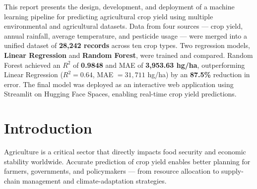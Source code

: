 \documentclass[12pt,a4paper]{article}
\begin{document}
\begin{titlepage}
\vfill


\vspace{1.2cm}
\restoregeometry
\end{titlepage}

\newpage\thispagestyle{empty}\tableofcontents\newpage
{}

\begin{mdframed}[
  linecolor=primary,linewidth=1.2pt,backgroundcolor=lightblue!30,
  innertopmargin=10pt,innerbottommargin=10pt,
  innerleftmargin=12pt,innerrightmargin=12pt,
  frametitle={\bfseries\color{white}\normalsize\; Abstract},
  frametitlebackgroundcolor=primary,frametitlerule=false,
  frametitleaboveskip=4pt,frametitlebelowskip=4pt]
\small
This report presents the design, development, and deployment of a machine learning
pipeline for predicting agricultural crop yield using multiple environmental and
agricultural datasets. Data from four sources --- crop yield, annual rainfall, average
temperature, and pesticide usage --- were merged into a unified dataset of
\textbf{28,242 records} across ten crop types. Two regression models,
\textbf{Linear Regression} and \textbf{Random Forest}, were trained and compared.
Random Forest achieved an $R^2$ of \textbf{0.9848} and MAE of \textbf{3,953.63 hg/ha},
outperforming Linear Regression ($R^2 = 0.64$, MAE $= 31{,}711$ hg/ha) by an
\textbf{87.5\%} reduction in error. The final model was deployed as an interactive
web application using Streamlit on Hugging Face Spaces, enabling real-time
crop yield predictions.
\end{mdframed}
\bigskip

\section{Introduction}

Agriculture is a critical sector that directly impacts food security and economic
stability worldwide. Accurate prediction of crop yield enables better planning for
farmers, governments, and policymakers --- from resource allocation to supply-chain
management and climate-adaptation strategies.
\end{document}
